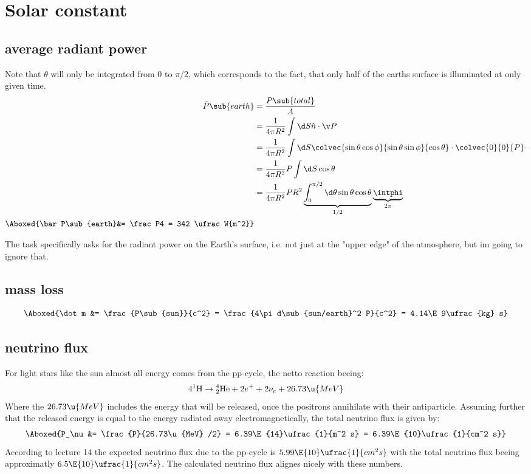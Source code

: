 \documentclass[exb]{exercise_5.0}
\begin{document}
\section{Solar constant}
\subsection{average radiant power}
Note that $\theta$ will only be integrated from $0$ to $\pi/2$, which corresponds to the fact, that only half of the earths surface is illuminated at only given time.
\begin{align*}
    \bar P\sub{earth} &= \frac{P\sub{total}}{A}\\
    &= \frac1{4\pi R^2}\int \d S \hat n \cdot \v P\\
    &= \frac1{4\pi R^2} \int \d S \colvec{\sin\theta\cos\phi}{\sin\theta\sin\phi}{\cos\theta}\cdot \colvec{0}{0}{P} \cdot\\
    &= \frac1{4\pi R^2}P \int \d S \cos\theta\\
    &= \frac1{4\pi R^2} P R^2\underbrace{\int_0^{\pi/2} \d\theta \sin\theta \cos\theta}_{1/2}\underbrace{\intphi }_{2\pi}\\
    \Aboxed{\bar P\sub{earth}&= \frac P4 = 342 \ufrac W{m^2}}
\end{align*}

The task specifically asks for the radiant power on the Earth's surface, i.e. not just at the "upper edge" of the atmosphere, but im going to ignore that.

\subsection{mass loss}
\begin{align*}
    \Aboxed{\dot m &= \frac{P\sub{sun}}{c^2} 
    = \frac{4\pi d\sub{sun/earth}^2 P}{c^2}
    = 4.14\E9\ufrac {kg} s}
\end{align*}

\subsection{neutrino flux}
For light stars like the sun almost all energy comes from the pp-cycle, the netto reaction beeing:
\begin{align*}
    4 ^1 \mathrm H \to {}^4_2\mathrm{He} + 2 e^+ + 2 \nu_e + 26.73\u{MeV}
\end{align*}
Where the $26.73\u{MeV}$ includes the energy that will be released, once the positrons annihilate with their antiparticle. Assuming further that the released energy is equal to the energy radiated away electromagnetically, the total neutrino flux is given by:
\begin{align*}
    \Aboxed{P_\nu &= \frac{P}{26.73\u{MeV} /2} = 6.39\E{14}\ufrac{1}{m^2 s}
    = 6.39\E{10}\ufrac{1}{cm^2 s}}
\end{align*} 
According to lecture 14 the expected neutrino flux due to the pp-cycle is $5.99\E{10}\ufrac{1}{cm^2 s}$ with the total neutrino flux beeing approximatly $6.5\E{10}\ufrac{1}{cm^2 s}$. The calculated neutrino flux alignes nicely with these numbers.
\end{document}
